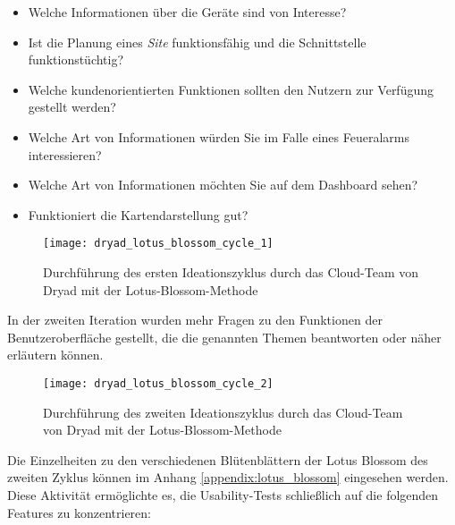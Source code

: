 \begin{itemize}
  \item Welche Informationen über die Geräte sind von Interesse?
  \item Ist die Planung eines \textit{Site} funktionsfähig und die Schnittstelle funktionstüchtig?
  \item Welche kundenorientierten Funktionen sollten den Nutzern zur Verfügung gestellt werden?
  \item Welche Art von Informationen würden Sie im Falle eines Feueralarms interessieren?
  \item Welche Art von Informationen möchten Sie auf dem Dashboard sehen?
  \item Funktioniert die Kartendarstellung gut?
\end{itemize}

\begin{figure}[H]
  \centering
  \texttt{[image: dryad\_lotus\_blossom\_cycle\_1]}
  \caption{Durchführung des ersten Ideationszyklus durch das Cloud-Team von Dryad mit der Lotus-Blossom-Methode}
  \label{fig:dryad_lotus_blossom_cycle_1}
\end{figure}

In der zweiten Iteration wurden mehr Fragen zu den Funktionen der Benutzeroberfläche gestellt, die die genannten Themen beantworten oder näher erläutern können.

\begin{figure}[H]
  \centering
  \texttt{[image: dryad\_lotus\_blossom\_cycle\_2]}
  \caption{Durchführung des zweiten Ideationszyklus durch das Cloud-Team von Dryad mit der Lotus-Blossom-Methode}
  \label{fig:dryad_lotus_blossom_cycle_2}
\end{figure}

Die Einzelheiten zu den verschiedenen Blütenblättern der Lotus Blossom des zweiten Zyklus können im Anhang \ref{appendix:lotus_blossom} eingesehen werden.\\

Diese Aktivität ermöglichte es, die Usability-Tests schließlich auf die folgenden Features zu konzentrieren:

